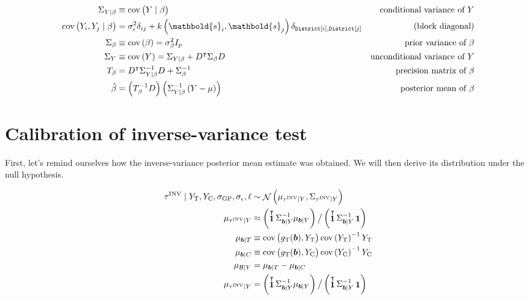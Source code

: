 \documentclass[letter]{article}
\DeclareMathOperator{\cov}{{cov}}
\DeclareMathOperator{\normal}{\mathcal{N}}
\DeclareMathOperator{\ones}{\mathbf{1}}
\newcommand{\district}{\mathtt{District}}
\newcommand{\trans}{^{\intercal}}
\newcommand{\treat}{\mathrm{T}}
\newcommand{\ctrol}{\mathrm{C}}
\newcommand{\sigmaf}{\sigma_{\mathrm{GP}}}
\newcommand{\sigman}{\sigma_{\epsilon}}
\newcommand{\svec}{\mathbold{s}}
\newcommand{\boundary}{\mathcal{B}}
\newcommand{\sentinels}{\bm{b}}
\newcommand{\invvar}{\tau^{\mathrm{INV}}}
\begin{document}
\begin{equation}
\begin{aligned}
    \Sigma_{Y \mid \beta} &\equiv \cov\del{Y \mid \beta } 
        & \text{conditional variance of $Y$} \\
    \cov\del{Y_i , Y_j \mid \beta } &= \sigman^2 \delta_{ij} + k\del{\svec_i,\svec_j} \delta_{\district\sbr{i},\district\sbr{j}} & \text{(block diagonal)}\\
    \Sigma_\beta &\equiv \cov\del{\beta} = \sigma_\beta^2 I_p
        & \text{prior variance of $\beta$} \\
    \Sigma_Y &\equiv \cov\del{Y} = \Sigma_{Y \mid \beta} + D\trans \Sigma_\beta D
        & \text{unconditional variance of $Y$} \\
    T_\beta &= D\trans \Sigma_{Y \mid \beta}^{-1} D + \Sigma^{-1}_\beta 
        & \text{precision matrix of $\beta$} \\
    \hat\beta &= \del{T_\beta^{-1} D} \del{ \Sigma_{Y \mid \beta}^{-1} \del{Y-\mu}}
        & \text{posterior mean of $\beta$}
\end{aligned}
\end{equation}
    


    	\section{Calibration of inverse-variance test}\label{calibration-of-inverse-variance-test}

First, let's remind ourselves how the inverse-variance posterior mean estimate was obtained. We will then derive its distribution under the null hypothesis.

\begin{equation}\begin{split}
    \invvar \mid Y_\treat{}, Y_\ctrol{}, \sigmaf, \sigman, \ell &\sim \normal\del{\mu_{\invvar \mid Y}, \Sigma_{\invvar \mid Y}} \\
    \mu_{\invvar \mid Y} &\approx \del{\ones\trans \Sigma_{\sentinels \mid Y}^{-1} \mu_{\sentinels \mid Y}} \big/ \del{\ones\trans \Sigma_{\sentinels \mid Y}^{-1} \ones}  \\
    \mu_{\sentinels \mid T} &\equiv \cov\del{g_\treat{}(\sentinels), Y_\treat{}} \cov\del{Y_\treat{}}^{-1}  Y_\treat{} \\
    \mu_{\sentinels \mid C} &\equiv \cov\del{g_\treat{}(\sentinels), Y_\ctrol{}} \cov\del{Y_\ctrol{}}^{-1}  Y_\ctrol{} \\
    \mu_{\boundary \mid Y} &=  \mu_{\sentinels \mid T} - \mu_{\sentinels \mid C} \\
    \mu_{\invvar \mid Y} &= \del{\ones\trans \Sigma_{\sentinels \mid Y}^{-1} \mu_{\sentinels \mid Y}} \big/ \del{\ones\trans \Sigma_{\sentinels \mid Y}^{-1} \ones}  \\
\end{split}\end{equation}
    
\end{document}
